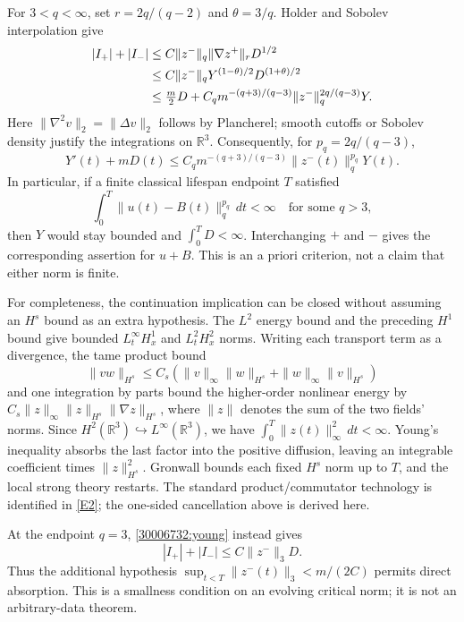 \documentclass[11pt,a4paper]{article}
\newcommand{\R}{\mathbb{R}}
\newcommand{\eref}[2]{\hyperlink{extra:#1:#2}{[E#2]}}
\numberwithin{equation}{section}
\begin{document}
For $3<q<\infty$, set $r=2q/(q-2)$ and $\theta=3/q$.
Holder and Sobolev interpolation give
\begin{align}
 |I_+|+|I_-|
 &\leq C\|z^-\|_q\|\nabla z^+\|_r D^{1/2} \notag\\
 &\leq C\|z^-\|_q Y^{(1-\theta)/2}D^{(1+\theta)/2} \notag\\
 &\leq \tfrac m2D+
 C_qm^{-(q+3)/(q-3)}\|z^-\|_q^{2q/(q-3)}Y.
 \label{30006732:young}
\end{align}
Here $\|\nabla^2v\|_2=\|\Delta v\|_2$ follows by Plancherel; smooth
cutoffs or Sobolev density justify the integrations on $\R^3$.
Consequently, for $p_q=2q/(q-3)$,
\begin{equation}\label{30006732:gronwall}
 Y'(t)+mD(t)\leq
 C_qm^{-(q+3)/(q-3)}\|z^-(t)\|_q^{p_q}Y(t).
\end{equation}
In particular, if a finite classical lifespan endpoint $T$ satisfied
\begin{equation}\label{30006732:missing}
 \int_0^T\|u(t)-B(t)\|_q^{p_q}\,dt<\infty
 \quad\text{for some }q>3,
\end{equation}
then $Y$ would stay bounded and $\int_0^TD<\infty$.
Interchanging $+$ and $-$ gives the corresponding assertion for $u+B$.
This is an a priori criterion, not a claim that either norm is finite.

For completeness, the continuation implication can be closed without
assuming an $H^s$ bound as an extra hypothesis. The $L^2$ energy bound
and the preceding $H^1$ bound give bounded $L^\infty_tH^1_x$ and
$L^2_tH^2_x$ norms. Writing each transport term as a divergence, the tame product bound
\[
 \|vw\|_{H^s}\leq C_s(\|v\|_\infty\|w\|_{H^s}
                          +\|w\|_\infty\|v\|_{H^s})
\]
and one integration by parts bound the higher-order nonlinear energy by
$C_s\|z\|_\infty\|z\|_{H^s}\|\nabla z\|_{H^s}$, where $\|z\|$
denotes the sum of the two fields' norms. Since
$H^2(\R^3)\hookrightarrow L^\infty(\R^3)$, we have
$\int_0^T\|z(t)\|_\infty^2\,dt<\infty$.
Young's inequality absorbs the last factor into the positive diffusion,
leaving an integrable coefficient times $\|z\|_{H^s}^2$.
Gronwall bounds each fixed $H^s$ norm up to $T$, and the local strong
theory restarts. The standard product/commutator technology is identified
in \eref{30006732}{2}; the one-sided cancellation above is derived here.

At the endpoint $q=3$, \eqref{30006732:young} instead gives
\[
 |I_+|+|I_-|\leq C\|z^-\|_3D.
\]
Thus the additional hypothesis
$\sup_{t<T}\|z^-(t)\|_3<m/(2C)$ permits direct absorption. This is a
smallness condition on an evolving critical norm; it is not an
arbitrary-data theorem.
\end{document}
